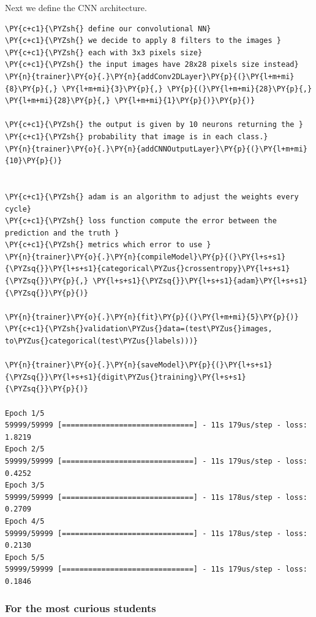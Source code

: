     Next we define the CNN architecture.

    \begin{tcolorbox}[breakable, size=fbox, boxrule=1pt, pad at break*=1mm,colback=cellbackground, colframe=cellborder]
\begin{Verbatim}[commandchars=\\\{\}]
\PY{c+c1}{\PYZsh{} define our convolutional NN}
\PY{c+c1}{\PYZsh{} we decide to apply 8 filters to the images }
\PY{c+c1}{\PYZsh{} each with 3x3 pixels size}
\PY{c+c1}{\PYZsh{} the input images have 28x28 pixels size instead}
\PY{n}{trainer}\PY{o}{.}\PY{n}{addConv2DLayer}\PY{p}{(}\PY{l+m+mi}{8}\PY{p}{,} \PY{l+m+mi}{3}\PY{p}{,} \PY{p}{(}\PY{l+m+mi}{28}\PY{p}{,} \PY{l+m+mi}{28}\PY{p}{,} \PY{l+m+mi}{1}\PY{p}{)}\PY{p}{)}

\PY{c+c1}{\PYZsh{} the output is given by 10 neurons returning the }
\PY{c+c1}{\PYZsh{} probability that image is in each class.}
\PY{n}{trainer}\PY{o}{.}\PY{n}{addCNNOutputLayer}\PY{p}{(}\PY{l+m+mi}{10}\PY{p}{)}
        

\PY{c+c1}{\PYZsh{} adam is an algorithm to adjust the weights every cycle}
\PY{c+c1}{\PYZsh{} loss function compute the error between the prediction and the truth }
\PY{c+c1}{\PYZsh{} metrics which error to use }
\PY{n}{trainer}\PY{o}{.}\PY{n}{compileModel}\PY{p}{(}\PY{l+s+s1}{\PYZsq{}}\PY{l+s+s1}{categorical\PYZus{}crossentropy}\PY{l+s+s1}{\PYZsq{}}\PY{p}{,} \PY{l+s+s1}{\PYZsq{}}\PY{l+s+s1}{adam}\PY{l+s+s1}{\PYZsq{}}\PY{p}{)}

\PY{n}{trainer}\PY{o}{.}\PY{n}{fit}\PY{p}{(}\PY{l+m+mi}{5}\PY{p}{)}
\PY{c+c1}{\PYZsh{}validation\PYZus{}data=(test\PYZus{}images, to\PYZus{}categorical(test\PYZus{}labels)))}
    
\PY{n}{trainer}\PY{o}{.}\PY{n}{saveModel}\PY{p}{(}\PY{l+s+s1}{\PYZsq{}}\PY{l+s+s1}{digit\PYZus{}training}\PY{l+s+s1}{\PYZsq{}}\PY{p}{)}

Epoch 1/5
59999/59999 [==============================] - 11s 179us/step - loss: 1.8219
Epoch 2/5
59999/59999 [==============================] - 11s 179us/step - loss: 0.4252
Epoch 3/5
59999/59999 [==============================] - 11s 178us/step - loss: 0.2709
Epoch 4/5
59999/59999 [==============================] - 11s 178us/step - loss: 0.2130
Epoch 5/5
59999/59999 [==============================] - 11s 179us/step - loss: 0.1846
    \end{Verbatim}
\end{tcolorbox}


 \subsubsection{For the most curious
students}\label{for-the-most-curious-students}

